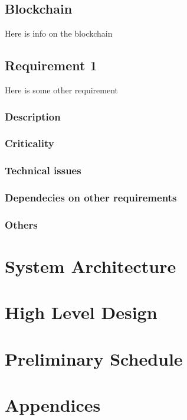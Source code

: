 \documentclass[a4paper,12pt]{article}
\begin{document}
\subsection{Blockchain}
\label{subsec:blockchain}
Here is info on the blockchain
\subsection{Requirement 1}
Here is some other requirement
\subsubsection{Description}
\subsubsection{Criticality}
\subsubsection{Technical issues}
\subsubsection{Dependecies on other requirements}
\subsubsection{Others}

\section{System Architecture}
\section{High Level Design}
\section{Preliminary Schedule}
\section{Appendices}


\newpage
\theendnotes
\end{document}
